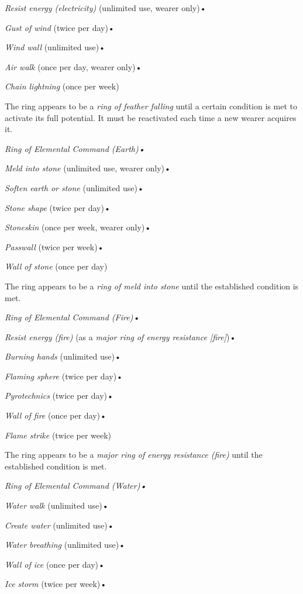 \textit{Resist energy (electricity) }(unlimited use, wearer only)•

\textit{Gust of wind }(twice per day)•

\textit{Wind wall }(unlimited use)•

\textit{Air walk }(once per day, wearer only)•

\textit{Chain lightning }(once per week)

The ring appears to be a \textit{ring of feather falling }until a certain condition 
is met to activate its full potential. It must be reactivated each time a new wearer 
acquires it.

\textit{Ring of Elemental Command (Earth)•}

\textit{Meld into stone }(unlimited use, wearer only)•

\textit{Soften earth or stone }(unlimited use)•

\textit{Stone shape }(twice per day)•

\textit{Stoneskin }(once per week, wearer only)•

\textit{Passwall }(twice per week)•

\textit{Wall of stone }(once per day)

The ring appears to be a \textit{ring of meld into stone }until the established 
condition is met.

\textit{Ring of Elemental Command (Fire)•}

\textit{Resist energy (fire) }(as a \textit{major ring of energy resistance [fire]})•

\textit{Burning hands }(unlimited use)•

\textit{Flaming sphere }(twice per day)•

\textit{Pyrotechnics }(twice per day)•

\textit{Wall of fire }(once per day)•

\textit{Flame strike }(twice per week)

The ring appears to be a \textit{major ring of energy resistance (fire) }until 
the established condition is met.

\textit{Ring of Elemental Command (Water)•}

\textit{Water walk }(unlimited use)•

\textit{Create water }(unlimited use)•

\textit{Water breathing }(unlimited use)•

\textit{Wall of ice }(once per day)•

\textit{Ice storm }(twice per week)•

